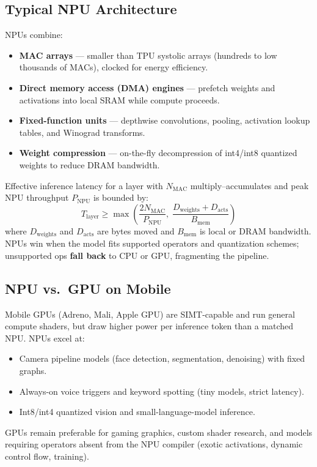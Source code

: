 \documentclass[11pt,journal,onecolumn]{IEEEtran}
\begin{document}
\subsection{Typical NPU Architecture}
NPUs combine:
\begin{itemize}
    \item \textbf{MAC arrays} --- smaller than TPU systolic arrays (hundreds to low thousands of MACs), clocked for energy efficiency.
    \item \textbf{Direct memory access (DMA) engines} --- prefetch weights and activations into local SRAM while compute proceeds.
    \item \textbf{Fixed-function units} --- depthwise convolutions, pooling, activation lookup tables, and Winograd transforms.
    \item \textbf{Weight compression} --- on-the-fly decompression of int4/int8 quantized weights to reduce DRAM bandwidth.
\end{itemize}

Effective inference latency for a layer with $N_{\mathrm{MAC}}$ multiply--accumulates and peak NPU throughput $P_{\mathrm{NPU}}$ is bounded by:
\begin{equation}
T_{\mathrm{layer}} \geq \max\!\left( \frac{2 N_{\mathrm{MAC}}}{P_{\mathrm{NPU}}},\; \frac{D_{\mathrm{weights}} + D_{\mathrm{acts}}}{B_{\mathrm{mem}}} \right)
\end{equation}
where $D_{\mathrm{weights}}$ and $D_{\mathrm{acts}}$ are bytes moved and $B_{\mathrm{mem}}$ is local or DRAM bandwidth. NPUs win when the model fits supported operators and quantization schemes; unsupported ops \textbf{fall back} to CPU or GPU, fragmenting the pipeline.

\subsection{NPU vs.\ GPU on Mobile}
Mobile GPUs (Adreno, Mali, Apple GPU) are SIMT-capable and run general compute shaders, but draw higher power per inference token than a matched NPU. NPUs excel at:
\begin{itemize}
    \item Camera pipeline models (face detection, segmentation, denoising) with fixed graphs.
    \item Always-on voice triggers and keyword spotting (tiny models, strict latency).
    \item Int8/int4 quantized vision and small-language-model inference.
\end{itemize}
GPUs remain preferable for gaming graphics, custom shader research, and models requiring operators absent from the NPU compiler (exotic activations, dynamic control flow, training).
\end{document}
